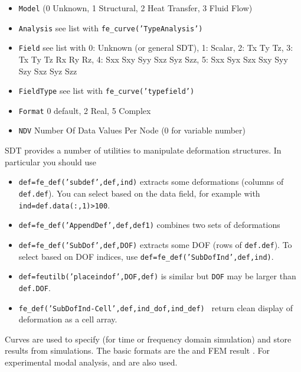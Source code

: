 \begin{itemize}
\item {\tt Model} (0 Unknown, 1 Structural, 2 Heat Transfer, 3 Fluid Flow)
\item {\tt Analysis} see list with {\tt fe\_curve('TypeAnalysis')}
\item {\tt Field} see list with 0: Unknown (or general SDT), 1: Scalar, 2: Tx Ty Tz, 3: Tx Ty Tz Rx Ry Rz, 4: Sxx Sxy Syy Sxz Syz Szz, 5: Sxx Syx Szx Sxy Syy
Szy Sxz Syz Szz
\item {\tt FieldType} see list with {\tt fe\_curve('typefield')}\\
\item {\tt Format} 0 default, 2 Real, 5 Complex\\
\item {\tt NDV} Number Of Data Values Per Node (0 for variable number)\\
\end{itemize}

\begin{SDT}
SDT provides a number of utilities to manipulate deformation structures. In particular you should use
\begin{itemize}
\item  {\tt def=fe\_def('subdef',def,ind)} extracts some deformations (columns of {\tt def.def}). You can select based on the data field, for example with {\tt ind=def.data(:,1)>100}.
\item   {\tt def=fe\_def('AppendDef',def,def1)} combines two sets of deformations
\item  {\tt def=fe\_def('SubDof',def,DOF)} extracts some DOF (rows of {\tt def.def}). To select based on DOF indices, use  {\tt def=fe\_def('SubDofInd',def,ind)}.
\item {\tt def=feutilb('placeindof',DOF,def)} is similar but {\tt DOF} may be larger than {\tt def.DOF}.

\item {\tt fe\_def('SubDofInd-Cell',def,ind\_dof,ind\_def) } return clean display of deformation as a cell array.
\end{itemize}
\end{SDT}

Curves are used to specify  (for time or frequency domain simulation) and store results from simulations. The basic formats are the  and FEM result . For experimental modal analysis,  and  are also used. 


